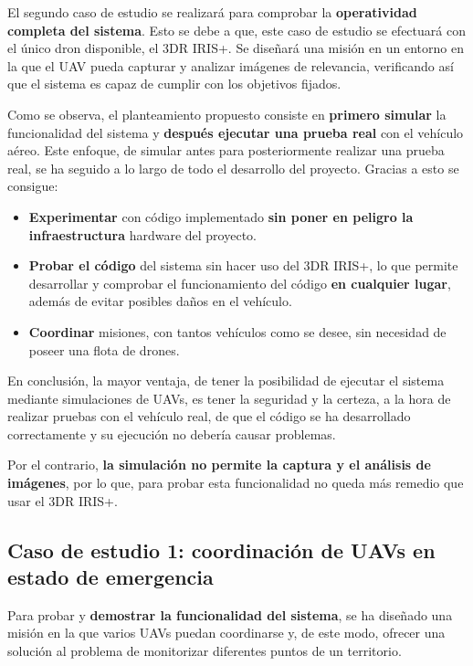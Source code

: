 El segundo caso de estudio se realizará para comprobar la \textbf{operatividad completa del sistema}. Esto se debe a que, este caso de estudio se efectuará con el único dron disponible, el 3DR IRIS+. Se diseñará una misión en un entorno en la que el \acs{UAV} pueda capturar y analizar imágenes de relevancia, verificando así que el sistema es capaz de cumplir con los objetivos fijados.

Como se observa, el planteamiento propuesto consiste en \textbf{primero simular} la funcionalidad del sistema y \textbf{después ejecutar una prueba real} con el vehículo aéreo. Este enfoque, de simular antes para posteriormente realizar una prueba real, se ha seguido a lo largo de todo el desarrollo del proyecto. Gracias a esto se consigue:

\begin{itemize}
\item \textbf{Experimentar} con código implementado \textbf{sin poner en peligro la infraestructura} hardware del proyecto.
\item \textbf{Probar el código} del sistema sin hacer uso del 3DR IRIS+, lo que permite desarrollar y comprobar el funcionamiento del código \textbf{en cualquier lugar}, además de evitar posibles daños en el vehículo.
\item \textbf{Coordinar} misiones, con tantos vehículos como se desee, sin necesidad de poseer una flota de drones.
\end{itemize}

En conclusión, la mayor ventaja, de tener la posibilidad de ejecutar el sistema mediante simulaciones de \acs{UAV}s, es tener la seguridad y la certeza, a la hora de realizar pruebas con el vehículo real, de que el código se ha desarrollado correctamente y su ejecución no debería causar problemas.

Por el contrario, \textbf{la simulación no permite la captura y el análisis de imágenes}, por lo que, para probar esta funcionalidad no queda más remedio que usar el 3DR IRIS+.

\subsection{Caso de estudio 1: coordinación de \acs{UAV}s en estado de emergencia}

Para probar y \textbf{demostrar la funcionalidad del sistema}, se ha diseñado una misión en la que varios \acs{UAV}s puedan coordinarse y, de este modo, ofrecer una solución al problema de monitorizar diferentes puntos de un territorio.

